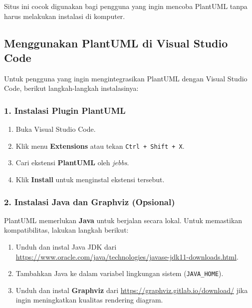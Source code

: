 Situs ini cocok digunakan bagi pengguna yang ingin mencoba PlantUML tanpa harus melakukan instalasi di komputer.

\subsection{Menggunakan PlantUML di Visual Studio Code}

Untuk pengguna yang ingin mengintegrasikan PlantUML dengan Visual Studio Code, berikut langkah-langkah instalasinya:

\subsubsection{1. Instalasi Plugin PlantUML}
\begin{enumerate}
	\item Buka Visual Studio Code.
	\item Klik menu \textbf{Extensions} atau tekan \texttt{Ctrl + Shift + X}.
	\item Cari ekstensi \textbf{PlantUML} oleh \textit{jebbs}.
	\item Klik \textbf{Install} untuk menginstal ekstensi tersebut.
\end{enumerate}

\subsubsection{2. Instalasi Java dan Graphviz (Opsional)}
PlantUML memerlukan \textbf{Java} untuk berjalan secara lokal. Untuk memastikan kompatibilitas, lakukan langkah berikut:
\begin{enumerate}
	\item Unduh dan instal Java JDK dari \url{https://www.oracle.com/java/technologies/javase-jdk11-downloads.html}.
	\item Tambahkan Java ke dalam variabel lingkungan sistem (\texttt{JAVA\_HOME}).
	\item Unduh dan instal \textbf{Graphviz} dari \url{https://graphviz.gitlab.io/download/} jika ingin meningkatkan kualitas rendering diagram.
\end{enumerate}

